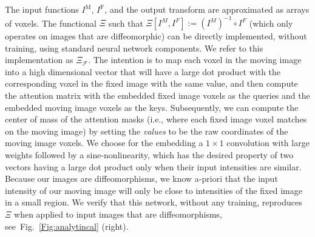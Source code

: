 The input functions $I^\text{M}$, $I^\text{F}$, and the output transform are approximated as arrays of voxels. The functional $\Xi$ such that $\Xi[I^M, I^F]:= (I^M)^{-1} \circ I^F$ (which only operates on images that are diffeomorphic) can be directly implemented, without training, using standard neural network components. We refer to this implementation as $\Xi_\mathcal{F}$. The intention is to map each voxel in the moving image into a high dimensional vector that will have a large dot product with the corresponding voxel in the fixed image with the same value, and then compute the attention matrix with the embedded fixed image voxels as the queries and the embedded moving image voxels as the keys. Subsequently, we can compute the center of mass of the attention masks (i.e., where each fixed image voxel matches on the moving image) by setting the \emph{values} to be the raw coordinates of the moving image voxels. We choose for the embedding a $1\times 1$ convolution with large weights followed by a sine-nonlinearity, which has the desired property of two vectors having a large dot product only when their input intensities are similar. Because our images are diffeomorphisms, we know a-priori that the input intensity of our moving image will only be close to intensities of the fixed image in a small region. We verify that this network, without any training, reproduces $\Xi$ when applied to input images that are diffeomorphisms, see~Fig.~\ref{Fig:analytincal} (right).
\vspace{-0.2cm}
